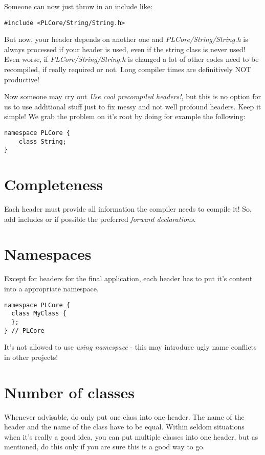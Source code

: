 Someone can now just throw in an include like:

\begin{lstlisting}[caption=Include]
#include <PLCore/String/String.h>
\end{lstlisting}

But now, your header depends on another one and \emph{PLCore/String/String.h} is always processed if your header is used, even if the string class is never used! Even worse, if \emph{PLCore/String/String.h} is changed a lot of other codes need to be recompiled, if really required or not. Long compiler times are definitively NOT productive!

Now someone may cry out \emph{Use cool precompiled headers!}, but this is no option for us to use additional stuff just to fix messy and not well profound headers. Keep it simple! We grab the problem on it's root by doing for example the following:

\begin{lstlisting}[caption=Forward declaration]
namespace PLCore {
    class String;
}
\end{lstlisting}




\section{Completeness}
Each header must provide all information the compiler needs to compile it! So, add includes or if possible the preferred \emph{forward declarations}.




\section{Namespaces}
Except for headers for the final application, each header has to put it's content into a appropriate namespace.

\begin{lstlisting}[caption=Namespace definition]
namespace PLCore {
  class MyClass {
  };
} // PLCore
\end{lstlisting}

It's not allowed to use \emph{using namespace} - this may introduce ugly name conflicts in other projects!




\section{Number of classes}
Whenever advisable, do only put one class into one header. The name of the header and the name of the class have to be equal. Within seldom situations when it's really a good idea, you can put multiple classes into one header, but as mentioned, do this only if you are sure this is a good way to go.




